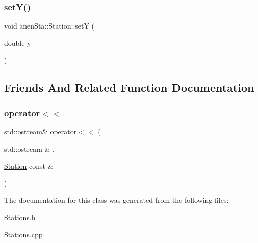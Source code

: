 \subsubsection{\texorpdfstring{set\+Y()}{setY()}}
{\footnotesize\ttfamily void anen\+Sta\+::\+Station\+::setY (\begin{DoxyParamCaption}\item[{double}]{y }\end{DoxyParamCaption})}



\subsection{Friends And Related Function Documentation}
\mbox{\label{classanen_sta_1_1_station_a98b2219804f7e593b080d3c8dec80f0b}} 
\subsubsection{\texorpdfstring{operator$<$$<$}{operator<<}}
{\footnotesize\ttfamily std\+::ostream\& operator$<$$<$ (\begin{DoxyParamCaption}\item[{std\+::ostream \&}]{,  }\item[{\mbox{\hyperlink{classanen_sta_1_1_station}{Station}} const \&}]{ }\end{DoxyParamCaption})\hspace{0.3cm}{\ttfamily [friend]}}



The documentation for this class was generated from the following files\+:\begin{DoxyCompactItemize}
\item 
\mbox{\hyperlink{_stations_8h}{Stations.\+h}}\item 
\mbox{\hyperlink{_stations_8cpp}{Stations.\+cpp}}\end{DoxyCompactItemize}
